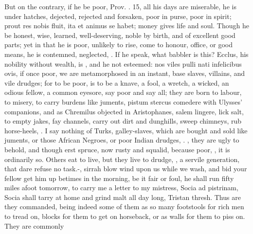 {But on the contrary, if he be poor, Prov. . 15, all his days are
miserable, he is under hatches, dejected, rejected and forsaken, poor
in purse, poor in spirit; prout res nobis fluit, ita et animus se
habet; money gives life and soul. Though he be honest, wise,
learned, well-deserving, noble by birth, and of excellent good parts;
yet in that he is poor, unlikely to rise, come to honour, office, or
good means, he is contemned, neglected, . If he speak, what babbler is this?
Ecclus, his nobility without wealth, is , and
he not esteemed: nos viles pulli nati infelicibus ovis, if once poor,
we are metamorphosed in an instant, base slaves, villains, and vile
drudges; for to be poor, is to be a knave, a fool, a wretch, a
wicked, an odious fellow, a common eyesore, say poor and say all; they
are born to labour, to misery, to carry burdens like juments, pistum
stercus comedere with Ulysses' companions, and as Chremilus objected in
Aristophanes,  salem lingere, lick salt, to empty jakes, fay
channels, carry out dirt and dunghills, sweep chimneys, rub
horse-heels, \etc{}. I say nothing of Turks, galley-slaves, which are
bought and sold like juments, or those African Negroes, or poor
Indian drudges, .
, they are ugly to behold, and though erst
spruce, now rusty and squalid, because poor, , it is ordinarily so. Others eat to
live, but they live to drudge, , a servile generation, that dare refuse no
task.-, sirrah blow wind upon us while we wash, and bid your fellow
get him up betimes in the morning, be it fair or foul, he shall run
fifty miles afoot tomorrow, to carry me a letter to my mistress, Socia
ad pistrinam, Socia shall tarry at home and grind malt all day long,
Tristan thresh. Thus are they commanded, being indeed some of them as
so many footstools for rich men to tread on, blocks for them to get on
horseback, or as walls for them to piss on. They are commonly
}
